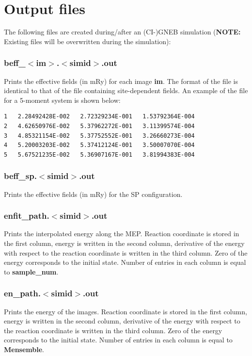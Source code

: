 \documentclass{article}
\begin{document}
\section{Output files}
The following files are created during/after an (CI-)GNEB simulation ({\bf NOTE:} Existing files will be overwritten during the simulation):

\subsubsection*{beff\_$<$im$>$.$<$simid$>$.out}
Prints the effective fields (in mRy) for each image {\bf im}. The format of the file is identical to that of the file containing site-dependent fields. An example of the file for a 5-moment system is shown below:

\begin{Verbatim}
1   2.28492428E-002   2.72329234E-001   1.53792364E-004
2   4.62650976E-002   5.37962272E-001   3.11399574E-004
3   4.85321154E-002   5.37752552E-001   3.26660273E-004
4   5.20003203E-002   5.37412124E-001   3.50007070E-004
5   5.67521235E-002   5.36907167E-001   3.81994383E-004
\end{Verbatim}

\subsubsection*{beff\_sp.$<$simid$>$.out}
Prints the effective fields (in mRy) for the SP configuration.

\subsubsection*{enfit\_path.$<$simid$>$.out}
Prints the interpolated energy along the MEP. Reaction coordinate is stored in the first column, energy is written in the second column, derivative of the energy with respect to the reaction coordinate is written in the third column. Zero of the energy corresponds to the initial state. Number of entries in each column is equal to {\bf sample\_num}.

\subsubsection*{en\_path.$<$simid$>$.out}
Prints the energy of the images. Reaction coordinate is stored in the first column, energy is written in the second column, derivative of the energy with respect to the reaction coordinate is written in the third column. Zero of the energy corresponds to the initial state. Number of entries in each column is equal to {\bf Mensemble}.
\end{document}
